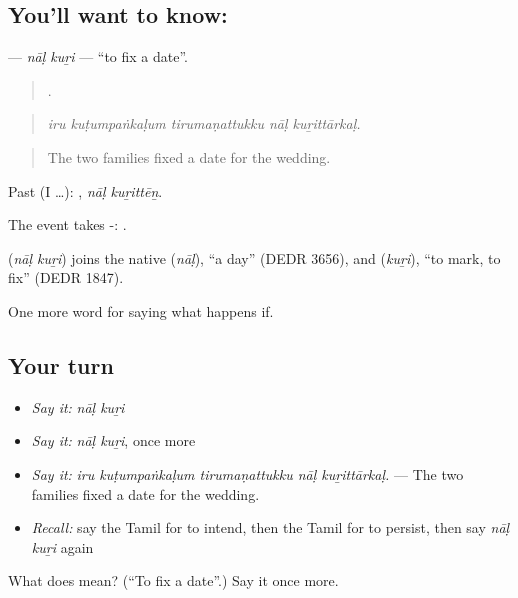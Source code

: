 \subsection*{You'll want to know:  }
\textbf{ } — \emph{nāḷ kuṟi} — \textquotedblleft{}to fix a date\textquotedblright{}.

\begin{quote}
    .
\end{quote}

\begin{quote}
\emph{iru kuṭumpaṅkaḷum tirumaṇattukku nāḷ kuṟittārkaḷ.}
\end{quote}

\begin{quote}
The two families fixed a date for the wedding.
\end{quote}

Past (I …):  , \emph{nāḷ kuṟittēṉ}.

The event takes -:   .

\begin{cousinweb}
\textbf{ } (\emph{nāḷ kuṟi}) joins the native  (\emph{nāḷ}), \textquotedblleft{}a day\textquotedblright{} (DEDR 3656), and  (\emph{kuṟi}), \textquotedblleft{}to mark, to fix\textquotedblright{} (DEDR 1847).
\end{cousinweb}

\begin{grammarlens}[title={What you've built}]
One more word for saying what happens if.
\end{grammarlens}

\subsection*{Your turn}
\begin{itemize}
\raggedright
  \item \emph{Say it:} \emph{nāḷ kuṟi}
  \item \emph{Say it:} \emph{nāḷ kuṟi}, once more
  \item \emph{Say it:} \emph{iru kuṭumpaṅkaḷum tirumaṇattukku nāḷ kuṟittārkaḷ.} — The two families fixed a date for the wedding.
  \item \emph{Recall:} say the Tamil for to intend, then the Tamil for to persist, then say \emph{nāḷ kuṟi} again
\end{itemize}

\begin{tcolorbox}[breakable,colback=teal!4,colframe=teal!35!black,title={Before you move on}]
What does   mean? (\textquotedblleft{}To fix a date\textquotedblright{}.) Say it once more.
\end{tcolorbox}
